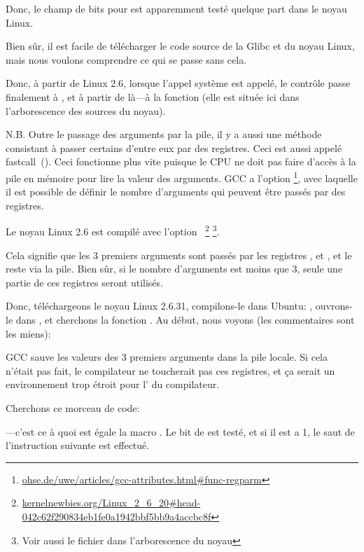 Donc, le champ de bits pour  est apparemment testé quelque part dans le
noyau Linux.

Bien sûr, il est facile de télécharger le code source de la Glibc et du noyau Linux,
mais nous voulons comprendre ce qui se passe sans cela.

Donc, à partir de Linux 2.6, lorsque l'appel système  est appelé, le
contrôle passe finalement à , et à partir de là---à la fonction
 (elle est située ici  dans l'arborescence des
sources du noyau).

\newcommand{\URLREGPARM}{\href{http://go.yurichev.com/17040}{ohse.de/uwe/articles/gcc-attributes.html\#func-regparm}}

\label{regparm}
N.B. Outre le passage des arguments par la pile, il y a aussi une méthode consistant
à passer certains d'entre eux par des registres. Ceci est aussi appelé fastcall~().
Ceci fonctionne plus vite puisque le CPU ne doit pas faire d'accès à la pile en mémoire
pour lire la valeur des arguments.
GCC a l'option \footnote{\URLREGPARM}, avec laquelle il est possible
de définir le nombre d'arguments qui peuvent être passés par des registres.

\newcommand{\URLKERNELNEWB}{\href{http://go.yurichev.com/17066}{kernelnewbies.org/Linux\_2\_6\_20\#head-042c62f290834eb1fe0a1942bbf5bb9a4accbc8f}}
\newcommand{\CALLINGHFILE}{arch/x86/include/asm/calling.h}

Le noyau Linux 2.6 est compilé avec l'option ~\footnote{\URLKERNELNEWB}
\footnote{Voir aussi le fichier \TT{\CALLINGHFILE} dans l'arborescence du noyau}.

Cela signifie que les 3 premiers arguments sont passés par les registres \EAX, \EDX
et \ECX, et le reste via la pile.
Bien sûr, si le nombre d'arguments est moins que 3, seule une partie de ces registres
seront utilisés.

Donc, téléchargeons le noyau Linux 2.6.31, compilons-le dans Ubuntu: ,
ouvrons-le dans \IDA, et cherchons la fonction . Au début, nous
voyons (les commentaires sont les miens):



GCC sauve les valeurs des 3 premiers arguments dans la pile locale.
Si cela n'était pas fait, le compilateur ne toucherait pas ces registres, et ça serait
un environnement trop étroit pour l'
du compilateur.

Cherchons ce morceau de code:



---c'est ce à quoi est égale la macro .
Le bit  de  est testé, et si il est a 1, le saut de l'instruction
\JNZ suivante est effectué.
